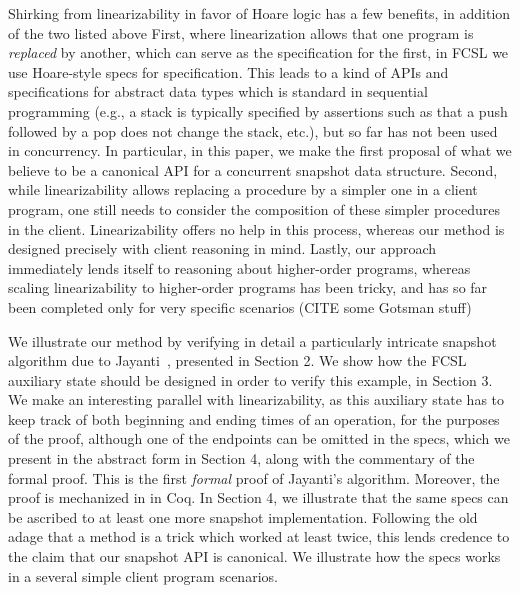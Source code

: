 Shirking from linearizability in favor of Hoare logic has a few
benefits, in addition of the two listed above First, where linearization
allows that one program is \emph{replaced} by another, which can serve
as the specification for the first, in FCSL we use Hoare-style specs
for specification. This leads to a kind of APIs and specifications for
abstract data types which is standard in sequential programming (e.g.,
a stack is typically specified by assertions such as that a push
followed by a pop does not change the stack, etc.), but so far has not
been used in concurrency. In particular, in this paper, we make the
first proposal of what we believe to be a canonical API for a
concurrent snapshot data structure.
Second, while linearizability allows replacing a procedure by a
simpler one in a client program, one still needs to consider the
composition of these simpler procedures in the client. Linearizability
offers no help in this process, whereas our method is
designed precisely with client reasoning in mind.
%
Lastly, our approach immediately lends itself to reasoning about
higher-order programs, whereas scaling linearizability to higher-order
programs has been tricky, and has so far been completed only for very
specific scenarios (CITE some Gotsman stuff)

We illustrate our method by verifying in detail a particularly
intricate snapshot algorithm due to Jayanti~\cite{Jayanti+stoc05},
presented in Section 2. We show how the FCSL auxiliary state should be
designed in order to verify this example, in Section 3. We make an
interesting parallel with linearizability, as this auxiliary state has
to keep track of both beginning and ending times of an operation, for
the purposes of the proof, although one of the endpoints can be
omitted in the specs, which we present in the abstract form in Section
4, along with the commentary of the formal proof. This is the first
\emph{formal} proof of Jayanti's algorithm. Moreover, the proof is
mechanized in in Coq.  In Section 4, we illustrate
that the same specs can be ascribed to at least one more snapshot
implementation. Following the old adage that a method is a trick which
worked at least twice, this lends credence to the claim that our
snapshot API is canonical. We illustrate how the specs works in a
several simple client program scenarios.





